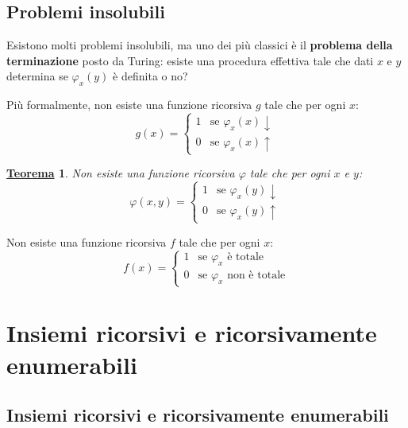 \documentclass[a4paper]{article}
\newtheorem{theorem}{\textcolor{Red3}{\underline{Teorema}}}
\begin{document}
	\subsection{Problemi insolubili}
	
	Esistono molti problemi insolubili, ma uno dei più classici è il \textcolor{Red3}{\textbf{problema della terminazione}} posto da Turing: esiste una procedura effettiva tale che dati $x$ e $y$ determina se $\varphi_{x}\left(y\right)$ è definita o no?\newline
	
	\noindent
	Più formalmente, non esiste una funzione ricorsiva $g$ tale che per ogni $x$:
	\begin{equation*}
		g\left(x\right) = \begin{cases}
			1 & \text{se } \varphi_{x}\left(x\right) \downarrow \\
			0 & \text{se } \varphi_{x}\left(x\right) \uparrow
		\end{cases}
	\end{equation*}
	\begin{theorem}
		Non esiste una funzione ricorsiva $\varphi$ tale che per ogni $x$ e $y$:
		\begin{equation*}
			\varphi\left(x,y\right) = \begin{cases}
				1 & \text{se } \varphi_{x}\left(y\right) \downarrow \\
				0 & \text{se } \varphi_{x}\left(y\right) \uparrow
			\end{cases}
		\end{equation*}
	\end{theorem}
	\noindent
	Non esiste una funzione ricorsiva $f$ tale che per ogni $x$:
	\begin{equation*}
		f\left(x\right) = \begin{cases}
			1 & \text{se } \varphi_{x} \text{ è totale} \\
			0 & \text{se } \varphi_{x} \text{ non è totale}
		\end{cases}
	\end{equation*}\newpage
	
	\section{Insiemi ricorsivi e ricorsivamente enumerabili}
	
	\subsection{Insiemi ricorsivi e ricorsivamente enumerabili}
	
\end{document}
